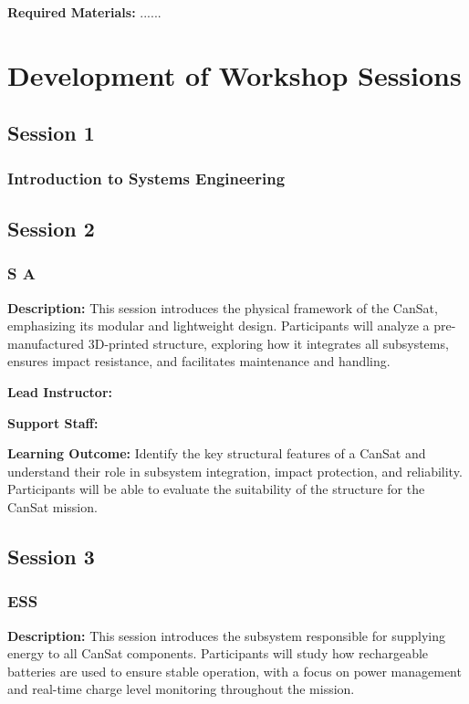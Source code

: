 \documentclass[a4paper,12pt]{article}
\begin{document}
\textbf{Required Materials:} ......

\newpage

\section{Development of Workshop Sessions}

\subsection{Session 1}

\subsubsection{Introduction to Systems Engineering}

\newpage

\subsection{Session 2}
\subsubsection{S A}

\textbf{Description:} This session introduces the physical framework of the CanSat, emphasizing its modular and lightweight design. Participants will analyze a pre-manufactured 3D-printed structure, exploring how it integrates all subsystems, ensures impact resistance, and facilitates maintenance and handling.

\textbf{Lead Instructor:}

\textbf{Support Staff: }

\textbf{Learning Outcome:} Identify the key structural features of a CanSat and understand their role in subsystem integration, impact protection, and reliability. Participants will be able to evaluate the suitability of the structure for the CanSat mission.

\newpage

\subsection{Session 3}
\subsubsection{ESS}

\textbf{Description:} This session introduces the subsystem responsible for supplying energy to all CanSat components. Participants will study how rechargeable batteries are used to ensure stable operation, with a focus on power management and real-time charge level monitoring throughout the mission.
\end{document}
